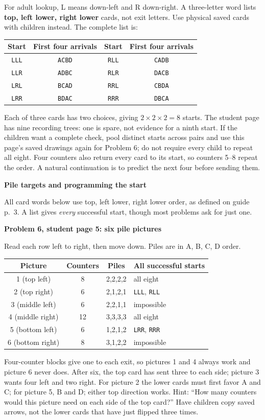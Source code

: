 \documentclass[11pt]{article}
\newcommand{\head}[1]{\par\textbf{\large #1}\par}
\newcommand{\sub}[1]{\par\textbf{#1}\par}
\newcommand{\code}[1]{\texttt{#1}}
\begin{document}
For adult lookup, L means down-left and R down-right. A three-letter word lists \textbf{top, left lower, right lower} cards, not exit letters. Use physical saved cards with children instead. The complete list is:
\begin{center}
\begin{tabular}{cc@{\hspace{20mm}}cc}
\toprule
Start & First four arrivals & Start & First four arrivals\\
\midrule
\code{LLL} & \code{ACBD} & \code{RLL} & \code{CADB}\\
\code{LLR} & \code{ADBC} & \code{RLR} & \code{DACB}\\
\code{LRL} & \code{BCAD} & \code{RRL} & \code{CBDA}\\
\code{LRR} & \code{BDAC} & \code{RRR} & \code{DBCA}\\
\bottomrule
\end{tabular}
\end{center}
Each of three cards has two choices, giving $2\times2\times2=8$ starts. The student page has nine recording trees: one is spare, not evidence for a ninth start. If the children want a complete check, pool distinct starts across pairs and use this page's saved drawings again for Problem 6; do not require every child to repeat all eight. Four counters also return every card to its start, so counters 5--8 repeat the order. A natural continuation is to predict the next four before sending them.
\newpage

\head{Pile targets and programming the start}
All card words below use top, left lower, right lower order, as defined on guide p.\ 3. A list gives \emph{every} successful start, though most problems ask for just one.

\sub{Problem 6, student page 5: six pile pictures}
Read each row left to right, then move down. Piles are in A, B, C, D order.
\begin{center}
\begin{tabular}{cccl}
\toprule
Picture & Counters & Piles & All successful starts\\
\midrule
1 (top left) & 8 & 2,2,2,2 & all eight\\
2 (top right) & 6 & 2,1,2,1 & \code{LLL}, \code{RLL}\\
3 (middle left) & 6 & 2,2,1,1 & impossible\\
4 (middle right) & 12 & 3,3,3,3 & all eight\\
5 (bottom left) & 6 & 1,2,1,2 & \code{LRR}, \code{RRR}\\
6 (bottom right) & 8 & 3,1,2,2 & impossible\\
\bottomrule
\end{tabular}
\end{center}
Four-counter blocks give one to each exit, so pictures 1 and 4 always work and picture 6 never does. After six, the top card has sent three to each side; picture 3 wants four left and two right. For picture 2 the lower cards must first favor A and C; for picture 5, B and D; either top direction works. Hint: ``How many counters would this picture need on each side of the top card?'' Have children copy saved arrows, not the lower cards that have just flipped three times.
\end{document}
